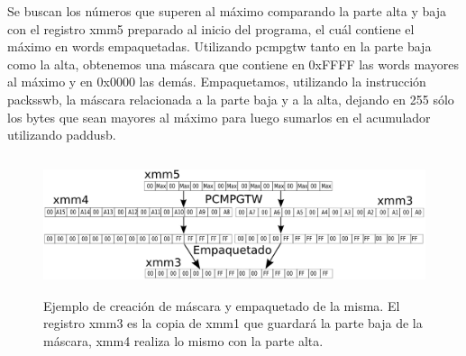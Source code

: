 \begin{center}
\end{center}

Se buscan los números que superen al máximo comparando la parte alta y baja con el registro xmm5 preparado al inicio del programa, el cuál contiene el máximo en words empaquetadas. Utilizando pcmpgtw tanto en la parte baja como la alta, obtenemos una máscara que contiene en 0xFFFF las words mayores al máximo y en 0x0000 las demás. Empaquetamos, utilizando la instrucción packsswb, la máscara relacionada a la parte baja y a la alta, dejando en 255 sólo los bytes que sean mayores al máximo para luego sumarlos en el acumulador utilizando paddusb.

\begin{figure}[H]
\centering
\includegraphics[width=150mm, height=40mm]{cpmmax.png}
\caption{Ejemplo de creación de máscara y empaquetado de la misma. El registro xmm3 es la copia de xmm1 que guardará la parte baja de la máscara, xmm4 realiza lo mismo con la parte alta.}
\label{overflow}
\end{figure}


